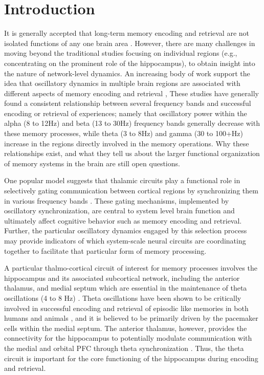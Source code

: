\documentclass[11pt, titlepage, twoside]{article}
\begin{document}
\section{Introduction}\label{sec:intro}

It is generally accepted that long-term memory encoding and retrieval are not isolated functions of any one brain area \cite{Gabrieli98,PrinceDaselaarCabeza05}.  However, there are many challenges in moving beyond the traditional studies focusing on individual regions  (e.g., concentrating on the prominent role of the hippocampus), to obtain insight into the nature of network-level dynamics.  An increasing body of work support the idea that oscillatory dynamics in multiple brain regions are associated with different aspects of  memory encoding and retrieval \cite{NyhusCurran10,HanslmayrStaudiglFellner12,Klimesch12}, %
These studies have generally found a consistent relationship between several frequency bands and successful encoding or retrieval of experiences; namely that oscillatory power within the alpha (8 to 12Hz) and beta (13 to 30Hz) frequency bands generally decrease with these memory processes, while theta (3 to 8Hz) and gamma (30 to 100+Hz) increase in the regions directly involved in the memory operations. Why these relationships exist, and what they tell us about the larger functional organization of memory systems in the brain are still open questions.
 
One popular model suggests that thalamic circuits play a functional role in selectively gating communication between cortical regions by synchronizing them in various frequency bands \cite{ShermanGuillery06,SaalmannKastner11,KetzJensenOReilly15}.  These gating mechanisms, implemented  by oscillatory synchronization, are central to system level brain function and ultimately affect cognitive behavior such as memory encoding and retrieval.  Further, the particular oscillatory dynamics engaged by this selection process may provide indicators of which system-scale neural circuits are coordinating together to facilitate that particular form of memory processing.

A particular thalmo-cortical circuit of interest for memory processes involves the hippocampus and its associated subcortical network, including the anterior thalamus, and medial septum which are essential in the maintenance of theta oscillations (4 to 8 Hz) \cite{Buzsaki02}.  Theta oscillations have been shown to be critically involved in successful encoding and retrieval of episodic like memories in both humans and animals \cite{NyhusCurran10,JonesWilson05,FuentemillaBarnesDuzelEtAl14}, and it is believed to be primarily driven by the pacemaker cells within the medial septum.  The anterior thalamus, however,  provides the connectivity for the hippocampus to potentially modulate communication with the medial and orbital PFC through theta synchronization \cite{VanderWerfJollesWitterEtAl03,AggletonDumontWarburton11}.  Thus, the theta circuit is important for the core functioning of the hippocampus during encoding and retrieval.
\end{document}

